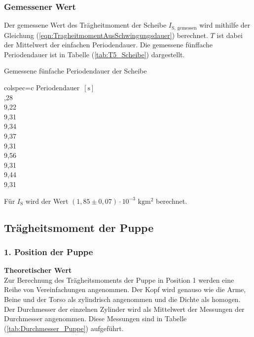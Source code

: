     \subsubsection{Gemessener Wert}
    Der gemessene Wert des Trägheitmoment der Scheibe $I_{\text{S, gemessen}}$ wird mithilfe der Gleichung (\ref{eqn:TragheitmomentAusSchwingungsdauer}) berechnet.
    $T$ ist dabei der Mittelwert der einfachen Periodendauer. Die gemessene fünffache Periodendauer ist in Tabelle (\ref{tab:T5_Scheibe}) dargestellt.
    \begin{table}[H]
      \centering 
      \caption{Gemessene fünfache Periodendauer der Scheibe}
      \label{tab:T5_Scheibe}
      \begin{tblr}{colspec={c}}
          \toprule
          Periodendauer $\,[\unit{\second}]$ \\
          ,28 \\
          9,22 \\
          9,31 \\
          9,34 \\
          9,37 \\
          9,31 \\
          9,56 \\
          9,31 \\
          9,44 \\
          9,31 \\
          \bottomrule
      \end{tblr}
    \end{table}
    Für $I_{\text{S}}$ wird der Wert $(1,85 \pm 0,07) \cdot 10^{-3} \,\,\unit{\kilo\gram\meter\squared}$ berechnet. 
     
  
  \subsection{Trägheitsmoment der Puppe}
    \subsubsection{1. Position der Puppe}
      \textbf{Theoretischer Wert}\\
        Zur Berechnung des Trägheitsmoments der Puppe in Position 1 werden eine Reihe von Vereinfachungen angenommen. Der Kopf wird genauso
        wie die Arme, Beine und der Torso als zylindrisch angenommen und die Dichte als homogen. Der Durchmesser der einzelnen Zylinder wird 
        als Mittelwert der Messungen der Durchmesser angenommen. Diese Messungen sind in Tabelle (\ref{tab:Durchmesser_Puppe}) aufgeführt. 

